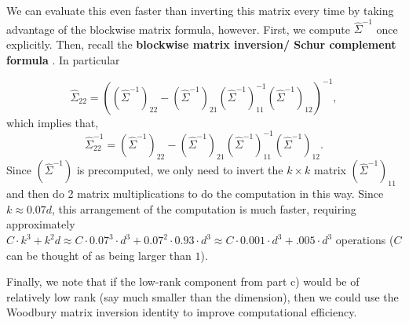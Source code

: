 \begin{enumerate}[label=(\alph*)]
  We can evaluate this even faster than inverting this matrix every time by taking advantage of the blockwise matrix formula, however. First, we compute $\hat{\Sigma}^{-1}$ once explicitly. Then, recall the \textbf{blockwise matrix inversion/ Schur complement formula }. In particular

$$\hat{\Sigma}_{22} = ((\hat{\Sigma}^{-1})_{22} - (\hat{\Sigma}^{-1})_{21} (\hat{\Sigma}^{-1})_{11}^{-1} (\hat{\Sigma}^{-1})_{12} )^{-1},$$
which implies that,
  \begin{equation*}
    \hat{\Sigma}_{22}^{-1} = (\hat{\Sigma}^{-1})_{22} - (\hat{\Sigma}^{-1})_{21} (\hat{\Sigma}^{-1})_{11}^{-1} (\hat{\Sigma}^{-1})_{12}.
  \end{equation*}
  Since $(\hat{\Sigma}^{-1})$ is precomputed, we only need to invert the $k \times k$ matrix $(\hat{\Sigma}^{-1})_{11}$ and then do 2 matrix multiplications to do the computation in this way.  Since $k \approx 0.07 d$, this arrangement of the computation is much faster, requiring approximately $C \cdot k^3 + k^2 d \approx C \cdot 0.07^3 \cdot d^3 + 0.07^2 \cdot 0.93 \cdot d^3 \approx C \cdot 0.001 \cdot d^3 + .005 \cdot d^3$ operations ($C$ can be thought of as being larger than $1$).

  Finally, we note that if the low-rank component from part c) would be of relatively low rank (say much smaller than the dimension), then we could use the Woodbury matrix inversion identity to improve computational efficiency. 



\end{enumerate}

